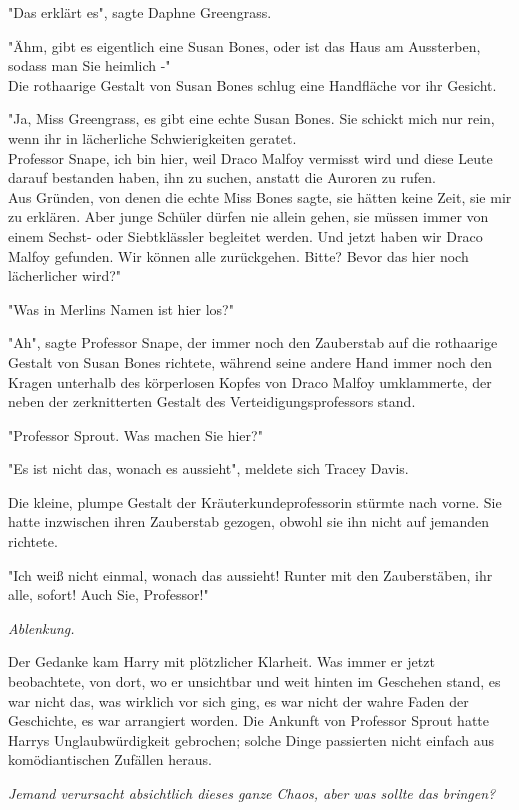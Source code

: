 {"Das erklärt es", sagte Daphne Greengrass.

"Ähm, gibt es eigentlich eine Susan Bones, oder ist das Haus am Aussterben, sodass man Sie heimlich -"\\ Die rothaarige Gestalt von Susan Bones schlug eine Handfläche vor ihr Gesicht.

"Ja, Miss Greengrass, es gibt eine echte Susan Bones. Sie schickt mich nur rein, wenn ihr in lächerliche Schwierigkeiten geratet.\\ Professor Snape, ich bin hier, weil Draco Malfoy vermisst wird und diese Leute darauf bestanden haben, ihn zu suchen, anstatt die Auroren zu rufen.\\ Aus Gründen, von denen die echte Miss Bones sagte, sie hätten keine Zeit, sie mir zu erklären. Aber junge Schüler dürfen nie allein gehen, sie müssen immer von einem Sechst- oder Siebtklässler begleitet werden. Und jetzt haben wir Draco Malfoy gefunden. Wir können alle zurückgehen. Bitte? Bevor das hier noch lächerlicher wird?"

"Was in Merlins Namen ist hier los?"

"Ah", sagte Professor Snape, der immer noch den Zauberstab auf die rothaarige Gestalt von Susan Bones richtete, während seine andere Hand immer noch den Kragen unterhalb des körperlosen Kopfes von Draco Malfoy umklammerte, der neben der zerknitterten Gestalt des Verteidigungsprofessors stand.

"Professor Sprout. Was machen Sie hier?"

"Es ist nicht das, wonach es aussieht", meldete sich Tracey Davis.

Die kleine, plumpe Gestalt der Kräuterkundeprofessorin stürmte nach vorne. Sie hatte inzwischen ihren Zauberstab gezogen, obwohl sie ihn nicht auf jemanden richtete.

"Ich weiß nicht einmal, wonach das aussieht! Runter mit den Zauberstäben, ihr alle, sofort! Auch Sie, Professor!"

\emph{Ablenkung.}

Der Gedanke kam Harry mit plötzlicher Klarheit. Was immer er jetzt beobachtete, von dort, wo er unsichtbar und weit hinten im Geschehen stand, es war nicht das, was wirklich vor sich ging, es war nicht der wahre Faden der Geschichte, es war arrangiert worden. Die Ankunft von Professor Sprout hatte Harrys Unglaubwürdigkeit gebrochen; solche Dinge passierten nicht einfach aus komödiantischen Zufällen heraus.

\emph{Jemand verursacht absichtlich dieses ganze Chaos, aber was sollte das bringen?}

}

